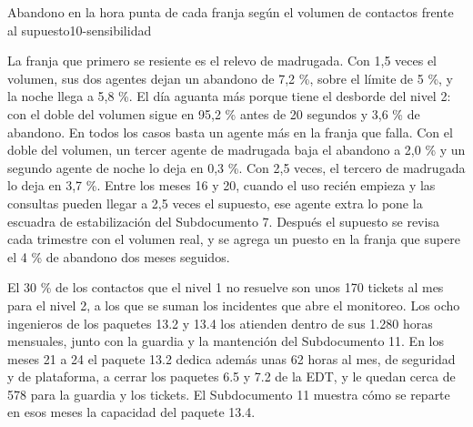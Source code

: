 \begin{figuraNativa}[!ht]{Abandono en la hora punta de cada franja según el volumen de contactos frente al supuesto}{10-sensibilidad}
\end{figuraNativa}

La franja que primero se resiente es el relevo de madrugada. Con 1,5 veces el volumen, sus dos agentes
dejan un abandono de 7,2 \%, sobre el límite de 5 \%, y la noche llega a 5,8 \%. El día aguanta más
porque tiene el desborde del nivel 2: con el doble del volumen sigue en 95,2 \% antes de 20 segundos y
3,6 \% de abandono. En todos los casos basta un agente más en la franja que falla. Con el doble del
volumen, un tercer agente de madrugada baja el abandono a 2,0 \% y un segundo agente de noche lo deja en
0,3 \%. Con 2,5 veces, el tercero de madrugada lo deja en 3,7 \%. Entre los meses 16 y 20, cuando el uso
recién empieza y las consultas pueden llegar a 2,5 veces el supuesto, ese agente extra lo pone la
escuadra de estabilización del Subdocumento 7. Después el supuesto se revisa cada trimestre con el
volumen real, y se agrega un puesto en la franja que supere el 4 \% de abandono dos meses seguidos.

El 30 \% de los contactos que el nivel 1 no resuelve son unos 170 tickets al mes para el nivel 2, a los
que se suman los incidentes que abre el monitoreo. Los ocho ingenieros de los paquetes 13.2 y 13.4 los
atienden dentro de sus 1.280 horas mensuales, junto con la guardia y la mantención del Subdocumento 11.
En los meses 21 a 24 el paquete 13.2 dedica además unas 62 horas al mes, de seguridad y de plataforma,
a cerrar los paquetes 6.5 y 7.2 de la EDT, y le quedan cerca de 578 para la guardia y los tickets. El
Subdocumento 11 muestra cómo se reparte en esos meses la capacidad del paquete 13.4.

